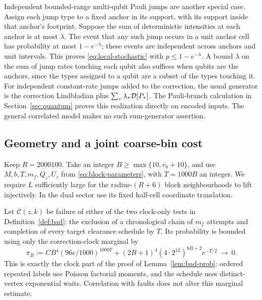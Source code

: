 Independent bounded-range multi-qubit Pauli jumps are another
special case. Assign each jump type to a fixed anchor in its
support, with its support inside that anchor's footprint.
Suppose the sum of deterministic intensities at each anchor is
at most \(\lambda\). The event that any such jump occurs in a
unit anchor cell has probability at most \(1-e^{-\lambda}\);
these events are independent across anchors and unit intervals.
This proves \eqref{eq:local-stochastic} with
\(p\le1-e^{-\lambda}\). A bound \(\lambda\) on the sum of jump
rates touching each qubit also suffices when qubits are the
anchors, since the types assigned to a qubit are a subset of
the types touching it. For independent constant-rate jumps added
to the correction, the usual generator is the correction
Lindbladian plus \(\sum_\tau\lambda_\tau\mathcal D[P_\tau]\).
The Pauli-branch calculation in Section~\ref{sec:quantum} proves
this realization directly on encoded inputs. The general
correlated model makes no such sum-generator assertion.

\subsection{Geometry and a joint coarse-bin cost}

Keep \(R=2000100\). Take an integer
\(B\ge\max\{10,r_0+10\}\), and use \(M,b,T,m_f,Q_z,U_z\) from
\eqref{eq:block-parameters}, with \(T=1000B\) an integer. We
require \(L\) sufficiently large for the radius-\((R+6)\) block
neighbourhoods to lift injectively. In the dual sector use its
fixed half-cell coordinate translation.

Let \(\mathcal C(z,k)\) be failure of either of the two
clock-only tests in Definition~\ref{def:bad}: the exclusion of
a chronological chain of \(m_f\) attempts and completion of
every target clearance schedule by \(T\). Its probability is
bounded using only the correction-clock marginal by
\begin{equation}\label{eq:clock-only}
 \pi_B:=CB^4(96e/1000)^{1000T}
 +(2B+1)^4(4\cdot2^{12})^{8B+2}e^{-T/2}
 \ \longrightarrow\ 0.
\end{equation}
This is exactly the clock part of the proof of
Lemma~\ref{lem:bad-prob}: ordered repeated labels use Poisson
factorial moments, and the schedule uses distinct-vertex
exponential waits. Correlation with faults does not alter
this marginal estimate.

